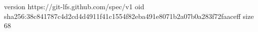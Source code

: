version https://git-lfs.github.com/spec/v1
oid sha256:38c841787c4d2cd4d4911f41c1554f82eba491e8071b2a07b0a283f72faaceff
size 68
